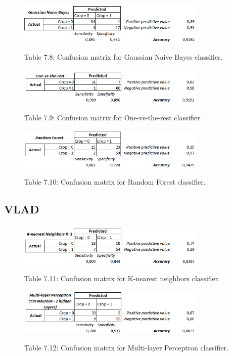 \documentclass[12pt]{article}
\numberwithin{equation}{section}
\numberwithin{table}{section}
\numberwithin{figure}{section}
\begin{document}
\begin{figure}[H] \centering
	\caption*{Table 7.8: Confusion matrix for Gaussian Naive Bayes classifier. }
	\includegraphics[width=0.8\textwidth]{m8.png}
	\label{m8}
\end{figure}

\begin{figure}[H] \centering
	\caption*{Table 7.9: Confusion matrix for One-vs-the-rest classifier. }
	\includegraphics[width=0.8\textwidth]{m9.png}
	\label{m9}
\end{figure}

\begin{figure}[H] \centering
	\caption*{Table 7.10: Confusion matrix for Random Forest classifier. }
	\includegraphics[width=0.8\textwidth]{m10.png}
	\label{m10}
\end{figure}


\subsection{VLAD}

\begin{figure}[H] \centering
	\caption*{Table 7.11: Confusion matrix for K-nearest neighbors classifier. }
	\includegraphics[width=0.8\textwidth]{m11.png}
	\label{m11}
\end{figure}

\begin{figure}[H] \centering
	\caption*{Table 7.12: Confusion matrix for Multi-layer Perceptron classifier. }
	\includegraphics[width=0.8\textwidth]{m12.png}
	\label{m12}
\end{figure}
\end{document}
